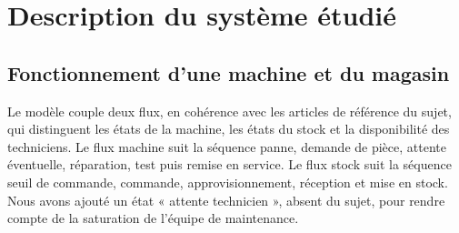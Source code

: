 \documentclass[11pt,a4paper]{article}
\begin{document}
\section{Description du système étudié}

\subsection{Fonctionnement d'une machine et du magasin}

Le modèle couple deux flux, en cohérence avec les articles de référence du sujet, qui distinguent les états de la machine, les états du stock et la disponibilité des techniciens. Le flux machine suit la séquence panne, demande de pièce, attente éventuelle, réparation, test puis remise en service. Le flux stock suit la séquence seuil de commande, commande, approvisionnement, réception et mise en stock. Nous avons ajouté un état « attente technicien », absent du sujet, pour rendre compte de la saturation de l'équipe de maintenance.
\end{document}
